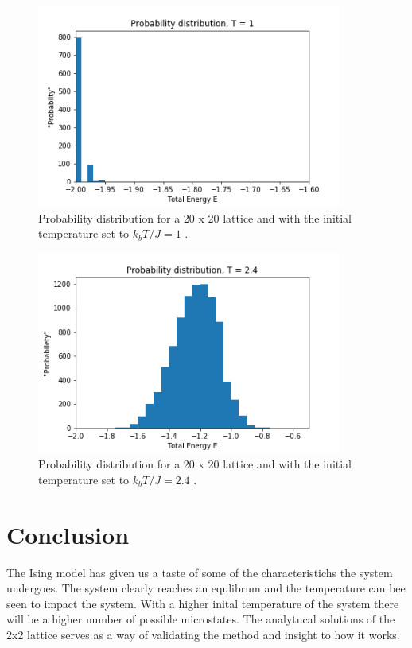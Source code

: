 \documentclass[twoside,twocolumn]{article}
\begin{document}
\begin{figure}[h]
  \includegraphics[width= 10cm]{probdist1.png}
  \caption{Probability distribution for a 20 x 20 lattice and with the initial temperature set to $k_bT/J = 1$ .}
  \label{fig:boat8}
\end{figure}

\begin{figure}[h]
  \includegraphics[width= 10cm]{probdist2.png}
  \caption{Probability distribution for a 20 x 20 lattice and with the initial temperature set to $k_bT/J = 2.4$ .}
  \label{fig:boat8}
\end{figure}












\section{Conclusion}
The Ising model has given us a taste of some of the characteristichs the system undergoes. The system clearly reaches an equlibrum and the temperature can bee seen to impact the system. With a higher inital temperature of the system there will be a higher number of possible microstates. The analytucal solutions of the 2x2 lattice serves as a way of validating the method and insight to how it works.
\end{document}
